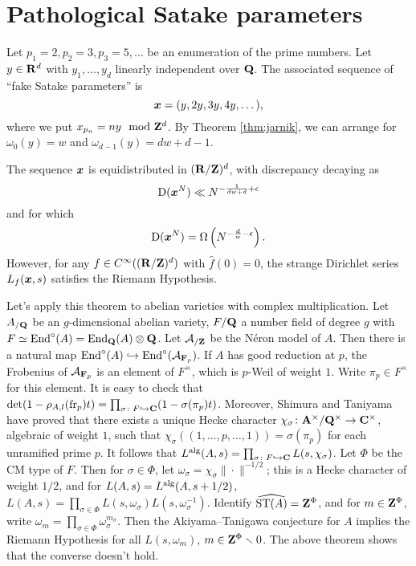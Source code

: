 \section{Pathological Satake parameters}

Let $p_1 = 2, p_2 = 3, p_3 = 5, \dots$ be an enumeration of the prime numbers. 
Let $y\in \mathbf{R}^d$ with $y_1,\dots,y_d$ linearly independent over $\mathbf{Q}$. The 
associated sequence of ``fake Satake parameters'' is 
\[
	{\boldsymbol x} = (y, 2y, 3 y, 4 y, \dots) ,
\]
where we put $x_{p_n} = n y\mod {\mathbf{Z}}^d$. By Theorem \ref{thm:jarnik}, we can 
arrange for $\omega_0(y) = w$ and $\omega_{d-1}(y) = d w + d - 1$. 

\begin{theorem}
The sequence ${\boldsymbol x}$ is equidistributed in $(\mathbf{R}/\mathbf{Z})^d$, with discrepancy 
decaying as 
\[
	\operatorname{D}({\boldsymbol x}^N) \ll N^{-\frac{1}{d w+d} + \epsilon} 
\]
and for which 
\[
	\operatorname{D}({\boldsymbol x}^N) = \Omega\left(N^{-\frac{d}{w} - \epsilon}\right) .
\]
However, for any $f\in C^\infty((\mathbf{R}/\mathbf{Z})^d)$ with $\widehat f(0)=0$, the 
strange Dirichlet series  $L_f({\boldsymbol x},s)$ satisfies the Riemann Hypothesis. 
\end{theorem}

Let's apply this theorem to abelian varieties with complex multiplication. 
Let $A_{/\mathbf{Q}}$ be an $g$-dimensional abelian variety, $F/\mathbf{Q}$ a number field 
of degree $g$ with $F\simeq \operatorname{End}^\circ(A) = \operatorname{End}_{\mathbf{Q}}(A)\otimes \mathbf{Q}$. Let 
$\mathcal{A}_{/\mathbf{Z}}$ be the N\'eron model of $A$. Then there is a natural map 
$\operatorname{End}^\circ(A) \hookrightarrow \operatorname{End}^\circ(\mathcal{A}_{\mathbf{F}_p})$. If $A$ has good 
reduction at $p$, the Frobenius of $\mathcal{A}_{\mathbf{F}_p}$ is an element of $F^\times$, 
which is $p$-Weil of weight $1$. Write $\pi_p\in F^\times$ for this element. It 
is easy to check that 
$\det(1-\rho_{A,l}(\mathrm{fr}_p) t) = \prod_{\sigma\colon F\hookrightarrow \mathbf{C}} (1 - \sigma(\pi_p) t)$. 
Moreover, Shimura and Taniyama have proved that there exists a unique Hecke 
character $\chi_\sigma\colon \mathbf{A}^\times/\mathbf{Q}^\times \to \mathbf{C}^\times$, algebraic 
of weight $1$, such that $\chi_\sigma((1,\dots,p,\dots,1)) = \sigma(\pi_p)$ 
for each unramified prime $p$. It follows that 
$L^{\mathrm{alg}}(A,s) = \prod_{\sigma\colon F\hookrightarrow \mathbf{C}} L(s,\chi_\sigma)$. 
Let $\Phi$ be the CM type of $F$. Then for $\sigma\in \Phi$, let 
$\omega_\sigma = \chi_\sigma \|\cdot\|^{-1/2}$; this is a Hecke character of 
weight $1/2$, and for $L(A,s) = L^{\mathrm{alg}}(A,s+1/2)$, 
$L(A,s) = \prod_{\sigma\in\Phi} L(s,\omega_\sigma) L(s,\omega_\sigma^{-1})$. 
Identify $\widehat{\mathrm{ST}(A)} = \mathbf{Z}^\Phi$, and for $m\in \mathbf{Z}^\Phi$, write 
$\omega_m = \prod_{\sigma\in \Phi} \omega_\sigma^{m_\sigma}$. Then the 
Akiyama--Tanigawa conjecture for $A$ implies the Riemann Hypothesis for all 
$L(s,\omega_m)$, $m\in \mathbf{Z}^\Phi\smallsetminus 0$. The above theorem shows that 
the converse doesn't hold. 
